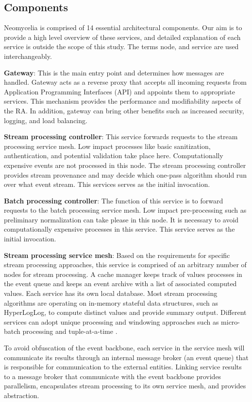 \documentclass[10pt, conference]{IEEEtran}
\begin{document}
\subsection{Components}

Neomycelia is comprised of 14 essential architectural components. Our aim is to provide a high level overview of these services, and detailed explanation of each service is outside the scope of this study. The terms node, and service are used interchangeably.

\textbf{Gateway}: This is the main entry point and determines how messages are handled. Gateway acts as a reverse proxy that accepts all incoming requests from Application Programming Interfaces (API) and appoints them to appropriate services. This mechanism provides the performance and modifiability aspects of the RA. In addition, gateway can bring other benefits such as increased security, logging, and load balancing.

\textbf{Stream processing controller}: This service forwards requests to the stream processing service mesh. Low impact processes like basic sanitization, authentication, and potential validation take place here. Computationally expensive events are not processed in this node. The stream processing controller provides stream provenance and may decide which one-pass algorithm should run over what event stream. This services serves as the initial invocation.

\textbf{Batch processing controller}: The function of this service is to forward requests to the batch processing service mesh. Low impact pre-processing such as preliminary normalization can take please in this node. It is necessary to avoid computationally expensive processes in this service. This service serves as the initial invocation.

\textbf{Stream processing service mesh}: Based on the requirements for specific stream processing approaches, this service is comprised of an arbitrary number of nodes for stream processing. A cache manager keeps track of values processes in the event queue and keeps an event archive with a list of associated computed values. Each service has its own local database. Most stream processing algorithms are operating on in-memory stateful data structures, such as HyperLogLog, to compute distinct values and provide summary output. Different services can adopt unique processing and windowing approaches such as micro-batch processing and tuple-at-a-time \cite{Sahal}.

To avoid obfuscation of the event backbone, each service in the service mesh will communicate its results through an internal message broker (an event queue) that is responsible for communication to the external entities. Linking service results to a message broker that communicate with the event backbone provides parallelism, encapsulates stream processing to its own service mesh, and provides abstraction.
\end{document}
